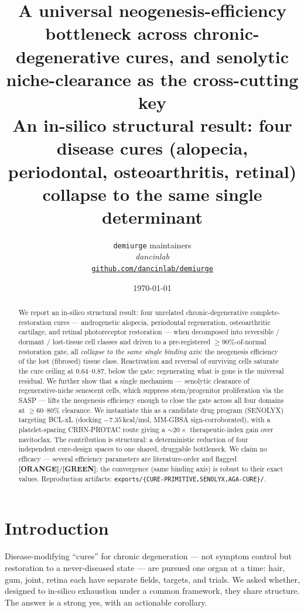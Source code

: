 \documentclass[11pt,a4paper]{article}
\title{
  \textbf{A universal neogenesis-efficiency bottleneck across chronic-degenerative
  cures, and senolytic niche-clearance as the cross-cutting key}\\[4pt]
  \large An in-silico structural result: four disease cures (alopecia, periodontal,
  osteoarthritis, retinal) collapse to the same single determinant
}
\author{
  \texttt{demiurge} maintainers\\
  \normalsize\textit{dancinlab}\\[2pt]
  \normalsize\href{https://github.com/dancinlab/demiurge}{\texttt{github.com/dancinlab/demiurge}}
}
\date{\today}
\newcommand{\tierbadge}[2]{\textcolor{#1}{\textbf{[#2]}}}
\providecommand{\tierGreen}{\tierbadge{green!45!black}{GREEN}}
\providecommand{\tierOrange}{\tierbadge{orange!80!black}{ORANGE}}
\begin{document}
\maketitle

\begin{abstract}
We report an in-silico structural result: four unrelated chronic-degenerative
complete-restoration cures --- androgenetic alopecia, periodontal regeneration,
osteoarthritic cartilage, and retinal photoreceptor restoration --- when decomposed
into reversible / dormant / lost-tissue cell classes and driven to a pre-registered
$\geq 90\%$-of-normal restoration gate, all \emph{collapse to the same single binding
axis}: the neogenesis efficiency of the lost (fibrosed) tissue class. Reactivation and
reversal of surviving cells saturate the cure ceiling at $0.64$--$0.87$, below the gate;
regenerating what is gone is the universal residual. We further show that a single
mechanism --- senolytic clearance of regenerative-niche senescent cells, which suppress
stem/progenitor proliferation via the SASP --- lifts the neogenesis efficiency enough to
close the gate across all four domains at $\geq 60$--$80\%$ clearance. We instantiate this
as a candidate drug program (SENOLYX) targeting BCL-xL (docking $-7.35$\,kcal/mol,
MM-GBSA sign-corroborated), with a platelet-sparing CRBN-PROTAC route giving a ${\sim}20\times$
therapeutic-index gain over navitoclax. The contribution is structural: a deterministic
reduction of four independent cure-design spaces to one shared, druggable bottleneck.
We claim no efficacy --- several efficiency parameters are literature-order and flagged
\tierOrange/\tierGreen; the convergence (same binding axis) is robust to their exact values.
Reproduction artifacts: \texttt{exports/\{CURE-PRIMITIVE,SENOLYX,AGA-CURE\}/}.
\end{abstract}

\section{Introduction}
\label{sec:intro}
Disease-modifying ``cures'' for chronic degeneration --- not symptom control but
restoration to a never-diseased state --- are pursued one organ at a time: hair, gum,
joint, retina each have separate fields, targets, and trials. We asked whether, designed
to in-silico exhaustion under a common framework, they share structure. The answer is a
strong yes, with an actionable corollary.
\end{document}
